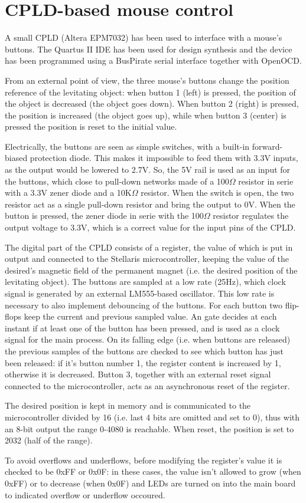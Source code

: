 \section{CPLD-based mouse control}
A small CPLD (Altera EPM7032) has been used to interface with a mouse's buttons. The Quartus II IDE has been used for design synthesis and the device has been programmed using a BusPirate serial interface together with OpenOCD.

From an external point of view, the three mouse's buttons change the position reference of the levitating object: when button 1 (left) is pressed, the position of the object is decreased (the object goes down). When button 2 (right) is pressed, the position is increased (the object goes up), while when button 3 (center) is pressed the position is reset to the initial value.

Electrically, the buttons are seen as simple switches, with a built-in forward-biased protection diode. This makes it impossible to feed them with 3.3V inputs, as the output would be lowered to 2.7V. So, the 5V rail is used as an input for the buttons, which close to pull-down networks made of a 100$\Omega$ resistor in serie with a 3.3V zener diode and a 10K$\Omega$ resistor. When the switch is open, the two resistor act as a single pull-down resistor and bring the output to 0V. When the button is pressed, the zener diode in serie with the 100$\Omega$ resistor regulates the output voltage to 3.3V, which is a correct value for the input pins of the CPLD.

The digital part of the CPLD consists of a register, the value of which is put in output and connected to the Stellaris microcontroller, keeping the value of the desired's magnetic field of the permanent magnet (i.e. the desired position of the levitating object). The buttons are sampled at a low rate (25Hz), which clock signal is generated by an external LM555-based oscillator. This low rate is necessary to also implement debouncing of the buttons. For each button two flip-flops keep the current and previous sampled value. An  gate decides at each instant if at least one of the button has been pressed, and is used as a clock signal for the main process. On its falling edge (i.e. when buttons are released) the previous samples of the buttons are checked to see which button has just been released: if it's button number 1, the register content is increased by 1, otherwise it is decreased. Button 3, together with an external reset signal connected to the microcontroller, acts as an asynchronous reset of the register.

The desired position is kept in memory and is communicated to the microcontroller divided by 16 (i.e. last 4 bits are omitted and set to 0), thus with an 8-bit output the range 0-4080 is reachable. When reset, the position is set to 2032 (half of the range).

To avoid overflows and underflows, before modifying the register's value it is checked to be 0xFF or 0x0F: in these cases, the value isn't allowed to grow (when 0xFF) or to decrease (when 0x0F) and LEDs are turned on into the main board to indicated overflow or underflow occoured.

